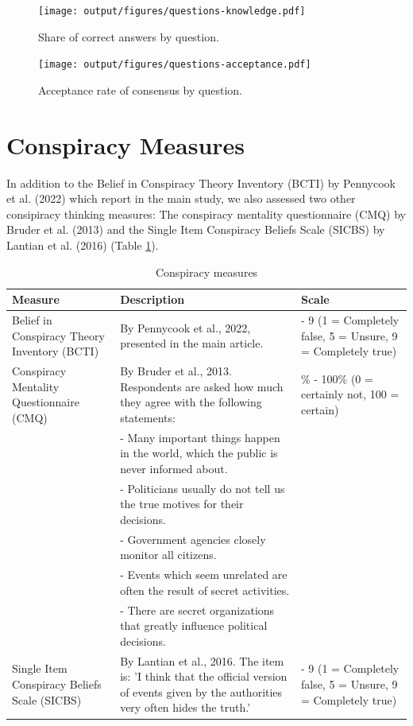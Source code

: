 \documentclass[
  doc,floatsintext]{apa6}
\begin{document}
\begin{figure}
\centering
\texttt{[image: output/figures/questions-knowledge.pdf]}
\caption{\label{fig:questions-knowledge}Share of correct answers by question.}
\end{figure}



\begin{figure}
\centering
\texttt{[image: output/figures/questions-acceptance.pdf]}
\caption{\label{fig:questions-acceptance}Acceptance rate of consensus by question.}
\end{figure}

\clearpage

\section{Conspiracy Measures}\label{exp1}

In addition to the Belief in Conspiracy Theory Inventory (BCTI) by Pennycook et al. (2022) which report in the main study, we also assessed two other consipiracy thinking measures: The conspiracy mentality questionnaire (CMQ) by Bruder et al. (2013) and the Single Item Conspiracy Beliefs Scale (SICBS) by Lantian et al. (2016) (Table \ref{tab:overview-conspiracy-measures}).

\begingroup\fontsize{8}{10}\selectfont

\begin{longtable}[t]{>{\raggedright\arraybackslash}p{10em}>{\raggedright\arraybackslash}p{20em}>{\raggedright\arraybackslash}p{10em}}
\caption{\label{tab:overview-conspiracy-measures}Conspiracy measures}\\
\toprule
Measure & Description & Scale\\
\midrule
Belief in Conspiracy Theory Inventory (BCTI) & By Pennycook et al., 2022, presented in the main article. & 1 - 9 (1 = Completely false, 5 = Unsure, 9 = Completely true)\\
Conspiracy Mentality Questionnaire (CMQ) & By Bruder et al., 2013. Respondents are asked how much they agree with the following statements: & 0\% - 100\% (0 = certainly not, 100 = certain)\\
 & - Many important things happen in the world, which the public is never informed about. & \\
 & - Politicians usually do not tell us the true motives for their decisions. & \\
 & - Government agencies closely monitor all citizens. & \\
\addlinespace
 & - Events which seem unrelated are often the result of secret activities. & \\
 & - There are secret organizations that greatly influence political decisions. & \\
Single Item Conspiracy Beliefs Scale (SICBS) & By Lantian et al., 2016. The item is: 'I think that the official version of events given by the authorities very often hides the truth.' & 1 - 9 (1 = Completely false, 5 = Unsure, 9 = Completely true)\\
\bottomrule
\end{longtable}
\endgroup{}
\end{document}
